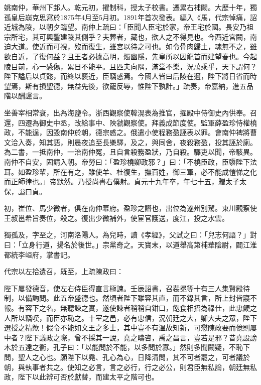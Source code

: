 
\begin{pinyinscope}

 姚南仲，華州下邽人。乾元初，擢制科，授太子校書。遷累右補闕。大歷十年，獨孤皇后崩克思寫於1875年4月至5月初。1891年首次發表。編入《馬，代宗悼痛，詔近城為陵，以朝夕臨望。南仲上疏曰：「臣聞人臣宅於家，帝王宅於國。長安乃祖宗所宅，其可興鑿建陵其側乎？夫葬者，藏也，欲人之不得見也。今西近宮闕，南迫大道。使近而可視，歿而復生，雖宮以待之可也。如令骨肉歸土，魂無不之，雖欲自近，了復何益？且王者必據高明，燭幽隱，先皇所以因龍首而建望春也。今起陵目前，心一感傷，累日不能平。且匹夫向隅，滿堂不樂，況萬乘乎，天下謂何？陛下謚后以貞懿，而終以褻近，臣竊惑焉。今國人皆曰后陵在邇，陛下將日省而時望焉，斯有損聖德，無益先後，欲寵反辱，惟陛下孰計。」疏奏，帝嘉納，進五品階以酬讜言。



 坐善宰相常袞，出為海鹽令。浙西觀察使韓滉表為推官，擢殿中侍御史內供奉。召還，四遷為御史中丞，改給事中、陜虢觀察使。拜義成節度使。監軍薛盈珍恃權橈政，不能逞，因毀南仲於朝，德宗惑之。俄遣小使程務盈誣表以罪。會南仲裨將曹文洽入奏，知其語，則晨夜追至長樂驛，及之，與同舍，夜殺務盈，投其誣於廁。為二書，一抵南仲，一治南仲冤，且自言殺務盈狀，乃自殺。驛吏以聞，帝駭異。南仲不自安，固請入朝。帝勞曰：「盈珍橈卿政邪？」曰：「不橈臣政，臣隳陛下法耳。如盈珍輩，所在有之，雖使羊、杜復生，撫百姓，御三軍，必不能成愷悌之化而正師律也。」帝默然。乃授尚書右僕射。貞元十九年卒，年七十五，贈太子太保，謚曰貞。



 初，崔位、馬少微者，俱在南仲幕府。盈珍之譖也，出位為遂州別駕。東川觀察使王叔邕希旨奏位，殺之。復出少微補外，使宦官護送，度江，投之水雲。



 獨孤及，字至之，河南洛陽人。為兒時，讀《孝經》，父試之曰：「兒志何語？」對曰：「立身行道，揚名於後世。」宗黨奇之。天寶末，以道舉高第補華陰尉，闢江淮都統李峘府，掌書記。



 代宗以左拾遺召，既至，上疏陳政曰：



 陛下屢發德音，使左右侍臣得直言極諫。壬辰詔書，召裴冕等十有三人集賢殿待制，以備詢問。此五帝盛德也。然頃者陛下雖容其直，而不錄其言，所上封皆寢不報。有容下之名，無聽諫之實，遂使諫者稍稍自鉗口，飽食相招為祿仕，此忠鯁之人所以竊嘆，而臣亦恥之。十室之邑，必有忠信，況朝廷之大，卿大夫之眾，陛下選授之精歟！假令不能如文王之多士，其中豈不有溫故知新，可懋陳政要而億則屢中者？陛下議政之際，曾不採其一說，堯之疇咨，禹之昌言，豈若是邪？昔堯設謗木於五達之衢，孔子曰：「以能問於不能，以多問於寡。」然則多聞闕疑，不恥下問，聖人之心也。願陛下以堯、孔心為心，日降清問，其不可者罷之，可者議於朝，與執事者共之。使知之必言，言之必行，行之必公，則君臣無私論，朝廷無私政，陛下以此辨可否於獻替，而建太平之階可也。




\end{pinyinscope}
